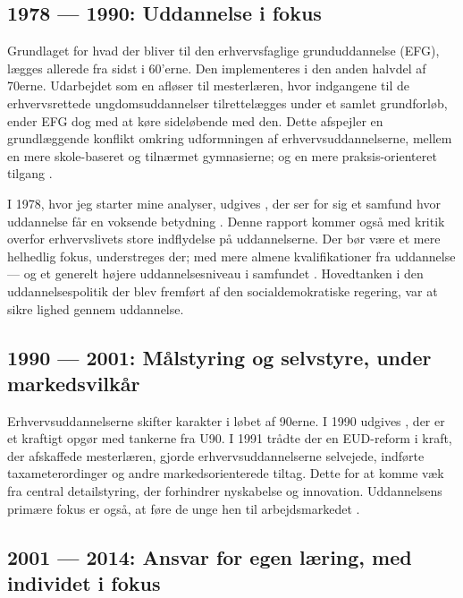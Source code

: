 \subsection{1978 — 1990: Uddannelse i fokus}
Grundlaget for hvad der bliver til den erhvervsfaglige grunduddannelse (EFG), lægges allerede fra sidst i 60'erne.
Den implementeres i den anden halvdel af 70erne.
Udarbejdet som en afløser til mesterlæren, hvor indgangene til de erhvervsrettede ungdomsuddannelser tilrettelægges under et samlet grundforløb, ender EFG dog med at køre sideløbende med den. 
Dette afspejler en grundlæggende konflikt omkring udformningen af erhvervsuddannelserne, mellem en mere skole-baseret og tilnærmet gymnasierne; og en mere praksis-orienteret tilgang \autocite[s. 49ff, 57]{bondergaardHistoricalEmergenceKey2014}.

I 1978, hvor jeg starter mine analyser, udgives , der ser for sig et samfund hvor uddannelse får en voksende betydning \autocite{undervisningsministeriet90SamletUddannelsesplanlaegning1978}.
Denne rapport kommer også med kritik overfor erhvervslivets store indflydelse på uddannelserne.
Der bør være et mere helhedlig fokus, understreges der; med mere almene kvalifikationer fra uddannelse — og et generelt højere uddannelsesniveau i samfundet \autocite[s 18f]{juulDiskurserOmUngdom2013}.
Hovedtanken i den uddannelsespolitik der blev fremført af den socialdemokratiske regering, var at sikre lighed gennem uddannelse.

\subsection{1990 — 2001: Målstyring og selvstyre, under markedsvilkår}

Erhvervsuddannelserne skifter karakter i løbet af 90erne.
I 1990 udgives , der er et kraftigt opgør med tankerne fra U90.
I 1991 trådte der en EUD-reform i kraft, der afskaffede mesterlæren, gjorde erhvervsuddannelserne selvejede, indførte taxameterordinger og andre markedsorienterede tiltag.
Dette for at komme væk fra central detailstyring, der forhindrer nyskabelse og innovation.
Uddannelsens primære fokus er også, at føre de unge hen til arbejdsmarkedet \autocite[s. 19]{juulDiskurserOmUngdom2013}.

\subsection{2001 — 2014: Ansvar for egen læring, med individet i fokus}

